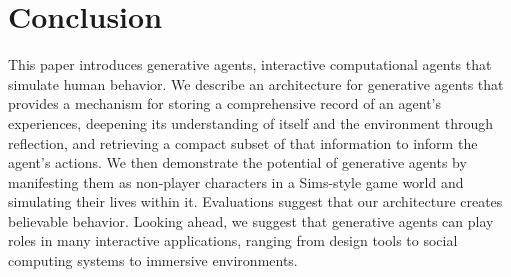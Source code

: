 \section{Conclusion}
This paper introduces generative agents, interactive computational agents that simulate human behavior. We describe an architecture for generative agents that provides a mechanism for storing a comprehensive record of an agent's experiences, deepening its understanding of itself and the environment through reflection, and retrieving a compact subset of that information to inform the agent's actions. We then demonstrate the potential of generative agents by manifesting them as non-player characters in a Sims-style game world and simulating their lives within it. Evaluations suggest that our architecture creates believable behavior. Looking ahead, we suggest that generative agents can play roles in many interactive applications, ranging from design tools to social computing systems to immersive environments.




